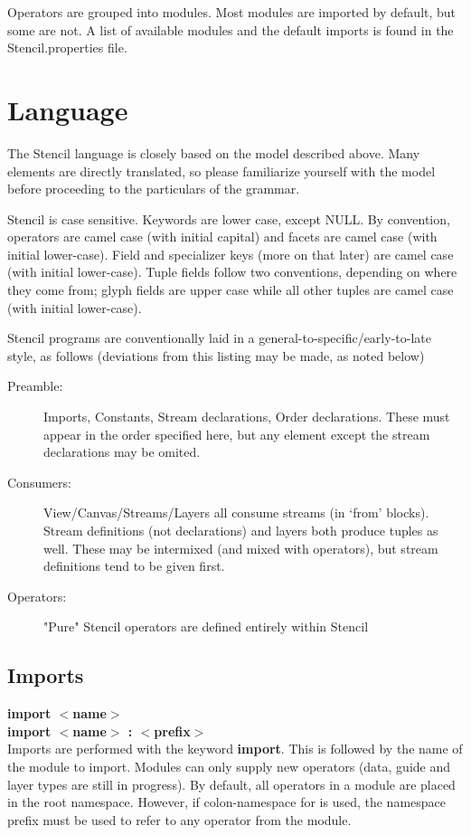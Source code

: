 \documentclass{article}
\begin{document}
Operators are grouped into modules.  Most modules are imported by default, but some are not.  
A list of available modules and the default imports is found in the Stencil.properties file.

\section{Language}
The Stencil language is closely based on the model described above.  
Many elements are directly translated, so please familiarize yourself with the model before proceeding to the particulars of the grammar.

Stencil is case sensitive.  
Keywords are lower case, except NULL.
By convention, operators are camel case (with initial capital) and facets are camel case (with initial lower-case).
Field and specializer keys (more on that later) are camel case (with initial lower-case).
Tuple fields follow two conventions, depending on where they come from; glyph fields are upper case while all other tuples are camel case (with initial lower-case).  

Stencil programs are conventionally laid in a general-to-specific/early-to-late style, as follows (deviations from this listing may be made, as noted below)
\begin{description}
	\item[Preamble: ] Imports, Constants, Stream declarations, Order declarations.
		These  must appear in the order specified here, but any element except the stream declarations may be omited.
	\item[Consumers: ] 
		View/Canvas/Streams/Layers all consume streams (in `from' blocks).
		Stream definitions (not declarations) and layers both produce tuples as well.
	       These may be intermixed (and mixed with operators), but stream definitions tend to be given first.
	\item[Operators: ] "Pure" Stencil operators are defined entirely within Stencil
\end{description}

\subsection{Imports}
\textbf{import $<$name$>$}\\
\textbf{import $<$name$>$ : $<$prefix$>$}\\
Imports are performed with the keyword \textbf{import}.  
This is followed by the name of the module to import.
Modules can only supply new operators (data, guide and layer types are still in progress).  
By default, all operators in a module are placed in the root namespace.  
However, if colon-namespace for is used, the namespace prefix must be used to refer to any operator from the module.
\end{document}
